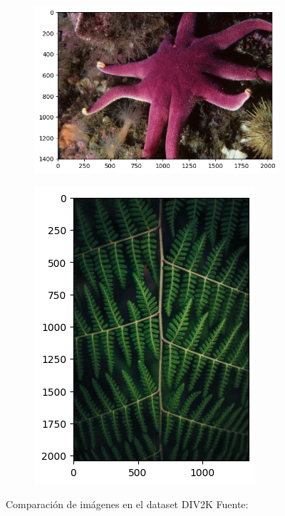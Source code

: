 \begin{figure}[H]
	\centering
	\begin{subfigure}{.4\textwidth}
		\includegraphics[width=\linewidth]{figures/div2k1.png}
		\caption{}
		\label{fig:div2k1}
	\end{subfigure}%
	\begin{subfigure}{.2\textwidth}
		\includegraphics[width=\linewidth]{figures/div2k2.png}
		\caption{}
		\label{fig:div2k2}
	\end{subfigure}%
	\caption{Comparación de imágenes en el dataset DIV2K Fuente:\cite{Agustsson_2017_CVPR_Workshops,8014884}}
	\label{fig:div2k}
\end{figure}

